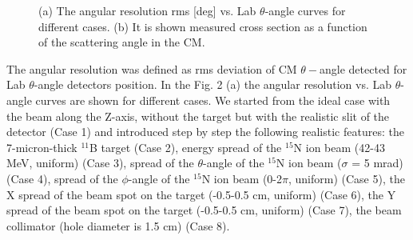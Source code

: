 \documentclass[%
 aip,
cp,  %
 amsmath,amssymb,%
 reprint,%
]{revtex4-2}
\begin{document}
\begin{figure}[h!]
\begin{minipage}[h]{0.49\linewidth}
\end{minipage}
\hfill
\begin{minipage}[h]{0.48\linewidth}
\end{minipage}
\vspace{0.05cm}
\caption{(a) The angular resolution rms [deg] vs. Lab $\theta$-angle curves for different cases. (b)  It is shown measured cross section as a function of the scattering angle in the CM. }
\label{ris:fig1}
\end{figure}

The angular resolution was defined as rms deviation of CM $\theta-$angle detected for Lab $\theta$-angle detectors position.
In the Fig. 2 (a) the angular resolution vs. Lab $\theta$-angle curves are shown for different cases. We started from the ideal case with the beam along the Z-axis, without the target but with the realistic slit of the detector (Case 1) and introduced step by step the following realistic features: the 7-micron-thick ${}^{11}$B target (Case 2), energy spread of the ${}^{15}$N ion beam (42-43 MeV, uniform) (Case 3), spread of the $\theta$-angle of the ${}^{15}$N ion beam ($\sigma$ = 5 mrad) (Case 4),  spread of the $\phi$-angle of the ${}^{15}$N ion beam (0-2$\pi$, uniform) (Case 5), the X spread of the beam spot on the target (-0.5-0.5 cm, uniform) (Case 6), the Y spread of the beam spot on the target (-0.5-0.5 cm, uniform) (Case 7), the beam collimator (hole diameter is 1.5 cm)  (Case 8).
\end{document}

